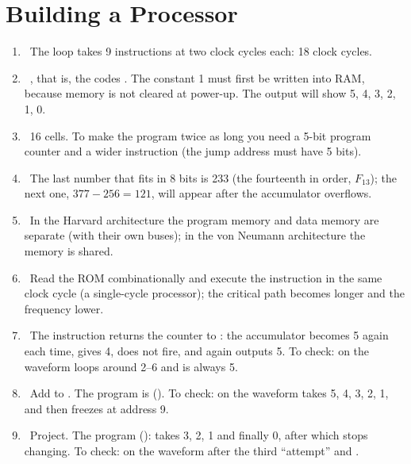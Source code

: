 \section*{Building a Processor}
\begin{enumerate}
  \item {}~The loop takes 9 instructions at two clock cycles each: 18 clock cycles.
  \item {}~, that is, the codes . The constant 1 must first be written into RAM, because memory is not cleared at power-up. The output will show 5, 4, 3, 2, 1, 0.
  \item {}~16 cells. To make the program twice as long you need a 5-bit program counter and a wider instruction (the jump address must have 5 bits).
  \item {}~The last number that fits in 8 bits is 233 (the fourteenth in order, $F_{13}$); the next one, $377 - 256 = 121$, will appear after the accumulator overflows.
  \item {}~In the Harvard architecture the program memory and data memory are separate (with their own buses); in the von Neumann architecture the memory is shared.
  \item {}~Read the ROM combinationally and execute the instruction in the same clock cycle (a single-cycle processor); the critical path becomes longer and the frequency lower.
  \item {}~The instruction  returns the counter to : the accumulator becomes 5 again each time,  gives 4,  does not fire, and  again outputs 5. To check: on the waveform  loops around 2--6 and  is always 5.
  \item {}~Add  to . The program is  (). To check: on the waveform  takes 5, 4, 3, 2, 1, and then  freezes at address 9.
  \item {}~Project. The program  ():  takes 3, 2, 1 and finally 0, after which  stops changing. To check: on the waveform after the third ``attempt''  and .
\end{enumerate}


